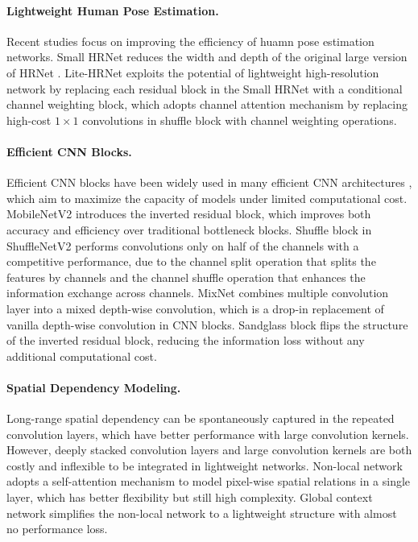 \documentclass{article}
\begin{document}
\paragraph{Lightweight Human Pose Estimation.} Recent studies \cite{wang:smallhrnet,yu:litehrnet} focus on improving the efficiency of huamn pose estimation networks. Small HRNet \cite{wang:smallhrnet} reduces the width and depth of the original large version of HRNet \cite{sun:hrnet}. Lite-HRNet \cite{yu:litehrnet} exploits the potential of lightweight high-resolution network by replacing each residual block in the Small HRNet with a conditional channel weighting block, which adopts channel attention mechanism \cite{wang:senet} by replacing high-cost $1 \times 1$ convolutions in shuffle block \cite{ma:shuffle2} with channel weighting operations.

\paragraph{Efficient CNN Blocks.} Efficient CNN blocks have been widely used in many efficient CNN architectures \cite{howard:mobile1,howard:mobile3,zhang:shuffle1}, which aim to maximize the capacity of models under limited computational cost. MobileNetV2 \cite{sandler:mobile2} introduces the inverted residual block, which improves both accuracy and efficiency over traditional bottleneck blocks. Shuffle block in ShuffleNetV2 \cite{ma:shuffle2} performs convolutions only on half of the channels with a competitive performance, due to the channel split operation that splits the features by channels and the channel shuffle operation that enhances the information exchange across channels. MixNet \cite{tan:mixnet} combines multiple convolution layer into a mixed depth-wise convolution, which is a drop-in replacement of vanilla depth-wise convolution in CNN blocks. Sandglass block \cite{zhou:next} flips the structure of the inverted residual block, reducing the information loss without any additional computational cost.

\paragraph{Spatial Dependency Modeling.} Long-range spatial dependency can be spontaneously captured in the repeated convolution layers, which have better performance with large convolution kernels. However, deeply stacked convolution layers and large convolution kernels are both costly and inflexible to be integrated in lightweight networks. Non-local network \cite{wang:nonlocal} adopts a self-attention mechanism to model pixel-wise spatial relations in a single layer, which has better flexibility but still high complexity. Global context network \cite{cao:gcnet} simplifies the non-local network to a lightweight structure with almost no performance loss.
\end{document}
